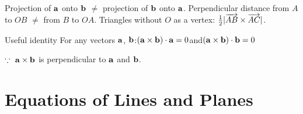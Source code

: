 \begin{info}[title=Note]
Projection of $\mathbf{a}$ onto $\mathbf{b}$ $\neq$ projection of $\mathbf{b}$ onto $\mathbf{a}$. Perpendicular distance from $A$ to $OB$ $\neq$ from $B$ to $OA$. Triangles without $O$ as a vertex: $\tfrac12|\overrightarrow{AB}\times\overrightarrow{AC}|$.
\end{info}
\begin{theorem}[before skip=0pt]{Useful identity}
For any vectors $\mathbf{a}$, $\mathbf{b}$:\quad $(\mathbf{a}\times\mathbf{b})\cdot\mathbf{a}=0$\quad and\quad $(\mathbf{a}\times\mathbf{b})\cdot\mathbf{b}=0$\par
$\because\ \mathbf{a}\times\mathbf{b}$ is perpendicular to $\mathbf{a}$ and $\mathbf{b}$.
\end{theorem}
\clearpage
{}
\section{Equations of Lines and Planes}
